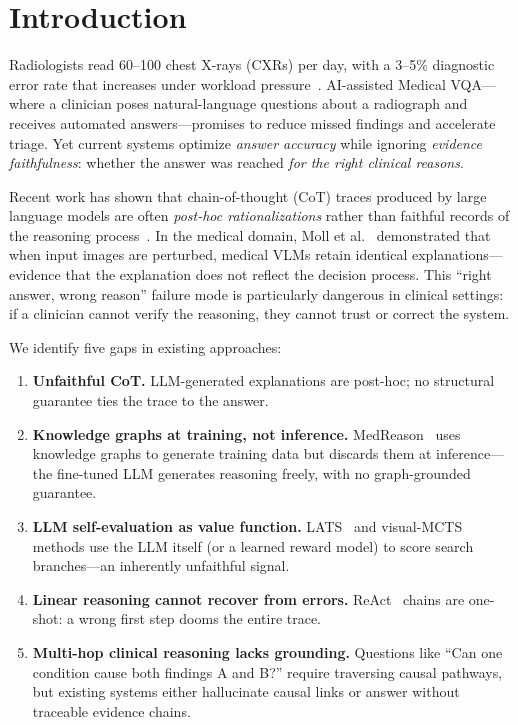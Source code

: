 \documentclass[runningheads]{llncs}
\begin{document}
\section{Introduction}
\label{sec:intro}

Radiologists read 60--100 chest X-rays (CXRs) per day, with a 3--5\%
diagnostic error rate that increases under workload
pressure~\cite{bruno2015error}.
AI-assisted Medical VQA---where a clinician poses natural-language questions
about a radiograph and receives automated answers---promises to reduce
missed findings and accelerate triage.
Yet current systems optimize \emph{answer accuracy} while ignoring
\emph{evidence faithfulness}: whether the answer was reached \emph{for the
right clinical reasons}.

Recent work has shown that chain-of-thought (CoT) traces produced by large
language models are often \emph{post-hoc rationalizations} rather than
faithful records of the reasoning process~\cite{turpin2023unfaithful,
arcuschin2025cot}.
In the medical domain, Moll et al.~\cite{moll2025evaluating}
demonstrated that when input images are perturbed, medical VLMs retain
identical explanations---evidence that the explanation does not reflect the
decision process.
This ``right answer, wrong reason'' failure mode is particularly dangerous
in clinical settings: if a clinician cannot verify the reasoning, they
cannot trust or correct the system.

We identify five gaps in existing approaches:
\begin{enumerate}
  \item \textbf{Unfaithful CoT.} LLM-generated explanations are post-hoc;
    no structural guarantee ties the trace to the answer.
  \item \textbf{Knowledge graphs at training, not inference.}
    MedReason~\cite{wang2025medreason} uses knowledge graphs to generate
    training data but discards them at inference---the fine-tuned LLM
    generates reasoning freely, with no graph-grounded guarantee.
  \item \textbf{LLM self-evaluation as value function.}
    LATS~\cite{zhou2024lats} and visual-MCTS methods use the LLM itself (or
    a learned reward model) to score search branches---an inherently
    unfaithful signal.
  \item \textbf{Linear reasoning cannot recover from errors.}
    ReAct~\cite{yao2023react} chains are one-shot: a wrong first step
    dooms the entire trace.
  \item \textbf{Multi-hop clinical reasoning lacks grounding.}
    Questions like ``Can one condition cause both findings A and B?'' require
    traversing causal pathways, but existing systems either hallucinate
    causal links or answer without traceable evidence chains.
\end{enumerate}
\end{document}
